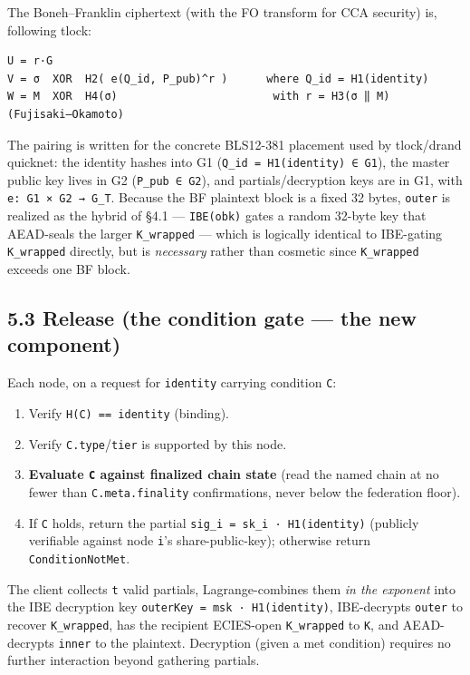 \documentclass[
  11pt,
]{article}
\providecommand{\tightlist}{%
  \setlength{\itemsep}{0pt}\setlength{\parskip}{0pt}}
\begin{document}
The Boneh--Franklin ciphertext (with the FO transform for CCA security)
is, following tlock:

\begin{verbatim}
U = r·G
V = σ  XOR  H2( e(Q_id, P_pub)^r )      where Q_id = H1(identity)
W = M  XOR  H4(σ)                        with r = H3(σ ‖ M)   (Fujisaki–Okamoto)
\end{verbatim}

The pairing is written for the concrete BLS12-381 placement used by
tlock/drand quicknet: the identity hashes into G1
(\texttt{Q\_id\ =\ H1(identity)\ ∈\ G1}), the master public key lives in
G2 (\texttt{P\_pub\ ∈\ G2}), and partials/decryption keys are in G1,
with \texttt{e:\ G1\ ×\ G2\ →\ G\_T}. Because the BF plaintext block is
a fixed 32 bytes, \texttt{outer} is realized as the hybrid of §4.1 ---
\texttt{IBE(obk)} gates a random 32-byte key that AEAD-seals the larger
\texttt{K\_wrapped} --- which is logically identical to IBE-gating
\texttt{K\_wrapped} directly, but is \emph{necessary} rather than
cosmetic since \texttt{K\_wrapped} exceeds one BF block.

\subsection{5.3 Release (the condition gate --- the new
component)}\label{release-the-condition-gate-the-new-component}

Each node, on a request for \texttt{identity} carrying condition
\texttt{C}:

\begin{enumerate}
\def\labelenumi{\arabic{enumi}.}
\tightlist
\item
  Verify \texttt{H(C)\ ==\ identity} (binding).
\item
  Verify \texttt{C.type}/\texttt{tier} is supported by this node.
\item
  \textbf{Evaluate \texttt{C} against finalized chain state} (read the
  named chain at no fewer than \texttt{C.meta.finality} confirmations,
  never below the federation floor).
\item
  If \texttt{C} holds, return the partial
  \texttt{sig\_i\ =\ sk\_i\ ·\ H1(identity)} (publicly verifiable
  against node \texttt{i}'s share-public-key); otherwise return
  \texttt{ConditionNotMet}.
\end{enumerate}

The client collects \texttt{t} valid partials, Lagrange-combines them
\emph{in the exponent} into the IBE decryption key
\texttt{outerKey\ =\ msk\ ·\ H1(identity)}, IBE-decrypts \texttt{outer}
to recover \texttt{K\_wrapped}, has the recipient ECIES-open
\texttt{K\_wrapped} to \texttt{K}, and AEAD-decrypts \texttt{inner} to
the plaintext. Decryption (given a met condition) requires no further
interaction beyond gathering partials.
\end{document}
